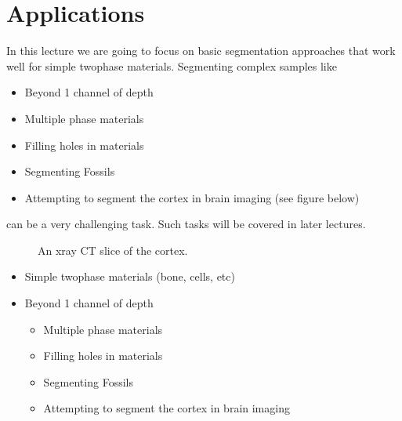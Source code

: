 \documentclass[letterpaper,10pt,english]{sphinxmanual}
\begin{document}
\chapter{Applications}
\label{\detokenize{04-BasicSegmentation:applications}}
\sphinxAtStartPar
In this lecture we are going to focus on basic segmentation approaches that work well for simple two\sphinxhyphen{}phase materials. Segmenting complex samples like
\begin{itemize}
\item {} 
\sphinxAtStartPar
Beyond 1 channel of depth

\item {} 
\sphinxAtStartPar
Multiple phase materials

\item {} 
\sphinxAtStartPar
Filling holes in materials

\item {} 
\sphinxAtStartPar
Segmenting Fossils

\item {} 
\sphinxAtStartPar
Attempting to segment the cortex in brain imaging (see figure below)

\end{itemize}

\sphinxAtStartPar
can be a very challenging task. Such tasks will be covered in later lectures.

\begin{figure}[htbp]
\centering
\capstart

\noindent{}
\caption{An x\sphinxhyphen{}ray CT slice of the cortex.}\label{\detokenize{04-BasicSegmentation:id2}}\end{figure}


\begin{itemize}
\item {} 
\sphinxAtStartPar
Simple two\sphinxhyphen{}phase materials (bone, cells, etc)

\item {} 
\sphinxAtStartPar
Beyond 1 channel of depth
\begin{itemize}
\item {} 
\sphinxAtStartPar
Multiple phase materials

\item {} 
\sphinxAtStartPar
Filling holes in materials

\item {} 
\sphinxAtStartPar
Segmenting Fossils

\item {} 
\sphinxAtStartPar
Attempting to segment the cortex in brain imaging

\end{itemize}

\end{itemize}
\end{document}
